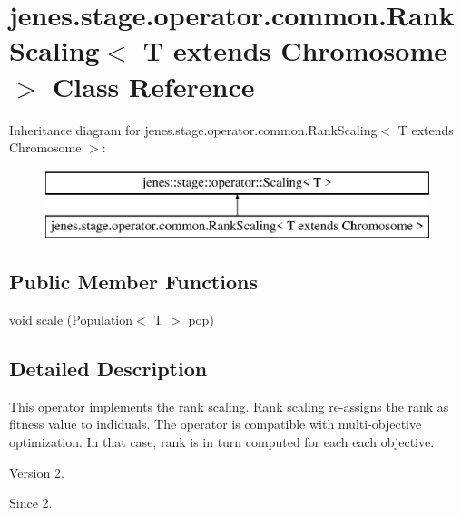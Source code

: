 \hypertarget{classjenes_1_1stage_1_1operator_1_1common_1_1_rank_scaling_3_01_t_01extends_01_chromosome_01_4}{\section{jenes.\-stage.\-operator.\-common.\-Rank\-Scaling$<$ T extends Chromosome $>$ Class Reference}
\label{classjenes_1_1stage_1_1operator_1_1common_1_1_rank_scaling_3_01_t_01extends_01_chromosome_01_4}
}
Inheritance diagram for jenes.\-stage.\-operator.\-common.\-Rank\-Scaling$<$ T extends Chromosome $>$\-:\begin{figure}[H]
\begin{center}
\leavevmode
\includegraphics[height=2.000000cm]{classjenes_1_1stage_1_1operator_1_1common_1_1_rank_scaling_3_01_t_01extends_01_chromosome_01_4}
\end{center}
\end{figure}
\subsection*{Public Member Functions}
\begin{DoxyCompactItemize}
\item 
void \hyperlink{classjenes_1_1stage_1_1operator_1_1common_1_1_rank_scaling_3_01_t_01extends_01_chromosome_01_4_a8158f18c672b8764a11ba70a52514132}{scale} (Population$<$ T $>$ pop)
\end{DoxyCompactItemize}


\subsection{Detailed Description}
This operator implements the rank scaling. Rank scaling re-\/assigns the rank as fitness value to indiduals. The operator is compatible with multi-\/objective optimization. In that case, rank is in turn computed for each each objective.

\begin{DoxyVersion}{Version}
2. 
\end{DoxyVersion}
\begin{DoxySince}{Since}
2. 
\end{DoxySince}


